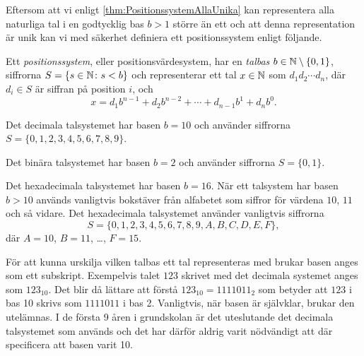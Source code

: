Eftersom att vi enligt \cref{thm:PositionssystemAllaUnika} kan representera
alla naturliga tal i en godtycklig bas \(b>1\) större än ett och att denna
representation är unik kan vi med säkerhet definiera ett positionssystem enligt
följande.
\begin{definition}\label{def:Positionssystem}
  Ett \emph{positionssystem}, eller positionsvärdesystem, har en
  \emph{talbas} \(b \in \mathbb{N} \setminus \{0,1\}\),
  siffrorna \(S=\{s\in\mathbb{N}\colon s<b\}\) och representerar ett tal \(x\in\mathbb{N}\) som
  \(d_1d_2\cdots d_n\), där \(d_i \in S\) är siffran på position \(i\), och
  \begin{equation}
    \nonumber
    x = d_1 b^{n-1} + d_2 b^{n-2} + \cdots + d_{n-1} b^1 + d_n b^0.
  \end{equation}
\end{definition}

\begin{example}\label{ex:DecimalaTalsystemet}
  Det decimala talsystemet har basen \(b=10\) och använder siffrorna
  \(S=\{0,1,2,3,4,5,6,7,8,9\}\).
\end{example}
\begin{example}\label{ex:BinaraTalsystemet}
  Det binära talsystemet har basen \(b=2\) och använder siffrorna
  \(S=\{0,1\}\).
\end{example}
\begin{example}\label{ex:HexadecimalaTalsystemet}
  Det hexadecimala talsystemet har basen \(b=16\).
  När ett talsystem har basen \(b>10\) används vanligtvis bokstäver från
  alfabetet som siffror för värdena \(10\), \(11\) och så vidare.
  Det hexadecimala talsystemet använder vanligtvis
  siffrorna \[S=\{0,1,2,3,4,5,6,7,8,9,A,B,C,D,E,F\},\] där \(A=10\),
  \(B=11\), \dots, \(F=15\).
\end{example}

För att kunna urskilja vilken talbas ett tal representeras med brukar basen
anges som ett subskript.
Exempelvis talet \(123\) skrivet med det decimala systemet anges som
\(123_{10}\).
Det blir då lättare att förstå \(123_{10} = 1111011_2\) som betyder att \(123\)
i bas 10 skrivs som \(1111011\) i bas 2.
Vanligtvis, när basen är självklar, brukar den utelämnas.
I de första 9 åren i grundskolan är det uteslutande det decimala talsystemet
som används och det har därför aldrig varit nödvändigt att där specificera att
basen varit 10.

